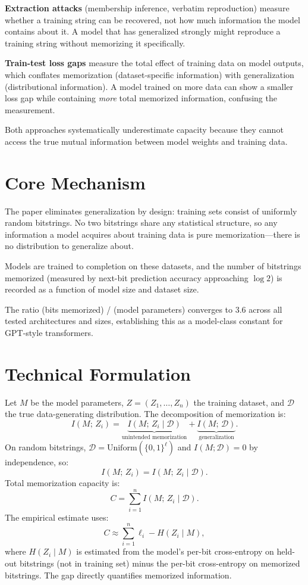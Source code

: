 \documentclass[10pt,twocolumn]{article}
\begin{document}
\textbf{Extraction attacks} (membership inference, verbatim reproduction)
measure whether a training string can be recovered, not how much information
the model contains about it. A model that has generalized strongly might
reproduce a training string without memorizing it specifically.

\textbf{Train-test loss gaps} measure the total effect of training data on
model outputs, which conflates memorization (dataset-specific information)
with generalization (distributional information). A model trained on more
data can show a smaller loss gap while containing \emph{more} total memorized
information, confusing the measurement.

Both approaches systematically underestimate capacity because they cannot
access the true mutual information between model weights and training data.

\section{Core Mechanism}

The paper eliminates generalization by design: training sets consist of
uniformly random bitstrings. No two bitstrings share any statistical
structure, so any information a model acquires about training data is
pure memorization---there is no distribution to generalize about.

Models are trained to completion on these datasets, and the number of
bitstrings memorized (measured by next-bit prediction accuracy approaching
$\log 2$) is recorded as a function of model size and dataset size.

The ratio (bits memorized) / (model parameters) converges to 3.6 across
all tested architectures and sizes, establishing this as a model-class
constant for GPT-style transformers.

\section{Technical Formulation}

Let $M$ be the model parameters, $Z = (Z_1, \ldots, Z_n)$ the training
dataset, and $\mathcal{D}$ the true data-generating distribution. The
decomposition of memorization is:
\[
I(M;\, Z_i) = \underbrace{I(M;\, Z_i \mid \mathcal{D})}_{\text{unintended memorization}}
            + \underbrace{I(M;\, \mathcal{D})}_{\text{generalization}}.
\]
On random bitstrings, $\mathcal{D} = \mathrm{Uniform}(\{0,1\}^\ell)$
and $I(M; \mathcal{D}) = 0$ by independence, so:
\[
I(M;\, Z_i) = I(M;\, Z_i \mid \mathcal{D}).
\]
Total memorization capacity is:
\[
C = \sum_{i=1}^{n} I(M;\, Z_i \mid \mathcal{D}).
\]
The empirical estimate uses:
\[
C \approx \sum_{i=1}^{n}\ell_i - H(Z_i \mid M),
\]
where $H(Z_i \mid M)$ is estimated from the model's per-bit cross-entropy
on held-out bitstrings (not in training set) minus the per-bit cross-entropy
on memorized bitstrings. The gap directly quantifies memorized information.
\end{document}
